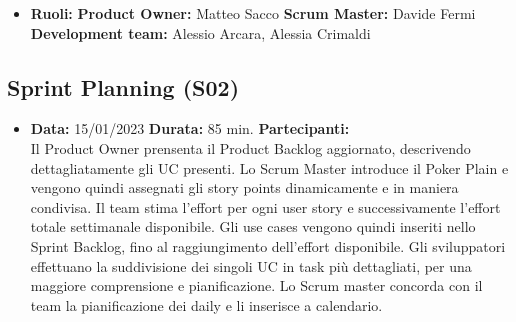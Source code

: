 \begin{landscape}
        \begin{itemize}
            \item \textbf{Ruoli:}
            \newline \textbf{Product Owner:} Matteo Sacco
            \newline \textbf{Scrum Master:} Davide Fermi
            \newline \textbf{Development team:} Alessio Arcara, Alessia Crimaldi
        \end{itemize}
        \vspace{5mm}
        \subsection{Sprint Planning (S02)}
        \begin{itemize}
            \item \textbf{Data:} 15/01/2023
            \newline \textbf{Durata:} 85 min.
            \newline \textbf{Partecipanti:} \dueP \due
            \\
            \newline Il Product Owner prensenta il Product Backlog aggiornato, descrivendo dettagliatamente gli UC presenti. Lo Scrum Master introduce il Poker Plain e vengono quindi assegnati gli story points dinamicamente e in maniera condivisa.  Il team stima l'effort per ogni user story e successivamente l'effort totale settimanale disponibile. Gli use cases vengono quindi inseriti nello Sprint Backlog, fino al raggiungimento dell'effort disponibile.  Gli sviluppatori effettuano la suddivisione dei singoli UC in task più dettagliati, per una maggiore comprensione e pianificazione. Lo Scrum master concorda con il team la pianificazione dei daily e li inserisce a calendario.
        \end{itemize}

        \newpage

\end{landscape}
